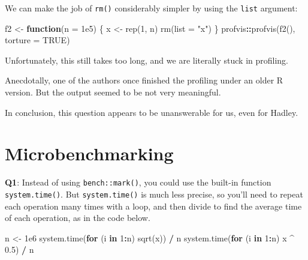 \documentclass[
]{krantz}
\makeatletter
\newenvironment{Shaded}{\begin{snugshade}}{\end{snugshade}}
\newcommand{\ControlFlowTok}[1]{\textcolor[rgb]{0.13,0.29,0.53}{\textbf{#1}}}
\newcommand{\DataTypeTok}[1]{\textcolor[rgb]{0.13,0.29,0.53}{#1}}
\newcommand{\DecValTok}[1]{\textcolor[rgb]{0.00,0.00,0.81}{#1}}
\newcommand{\FloatTok}[1]{\textcolor[rgb]{0.00,0.00,0.81}{#1}}
\newcommand{\KeywordTok}[1]{\textcolor[rgb]{0.13,0.29,0.53}{\textbf{#1}}}
\newcommand{\NormalTok}[1]{#1}
\newcommand{\OperatorTok}[1]{\textcolor[rgb]{0.81,0.36,0.00}{\textbf{#1}}}
\newcommand{\OtherTok}[1]{\textcolor[rgb]{0.56,0.35,0.01}{#1}}
\newcommand{\StringTok}[1]{\textcolor[rgb]{0.31,0.60,0.02}{#1}}
\newenvironment{kframe}{%
\medskip{}
\setlength{\fboxsep}{.8em}
 \def\at@end@of@kframe{}%
 \ifinner\ifhmode%
  \def\at@end@of@kframe{\end{minipage}}%
  \begin{minipage}{\columnwidth}%
 \fi\fi%
 \def\FrameCommand##1{\hskip\@totalleftmargin \hskip-\fboxsep
 \colorbox{shadecolor}{##1}\hskip-\fboxsep
     \hskip-\linewidth \hskip-\@totalleftmargin \hskip\columnwidth}%
 \MakeFramed {\advance\hsize-\width
   \@totalleftmargin\z@ \linewidth\hsize
   \@setminipage}}%
 {\par\unskip\endMakeFramed%
 \at@end@of@kframe}
\renewenvironment{Shaded}{\begin{kframe}}{\end{kframe}}
\renewcommand{\KeywordTok} [1]{\textcolor[rgb]{0.00,0.44,0.13}{{#1}}}
\renewcommand{\DataTypeTok}[1]{\textcolor[rgb]{0.56,0.13,0.00}{{#1}}}
\renewcommand{\DecValTok}  [1]{\textcolor[rgb]{0.25,0.63,0.44}{{#1}}}
\renewcommand{\FloatTok}   [1]{\textcolor[rgb]{0.25,0.63,0.44}{{#1}}}
\renewcommand{\StringTok}  [1]{\textcolor[rgb]{0.25,0.44,0.63}{{#1}}}
\renewcommand{\OtherTok}   [1]{\textcolor[rgb]{0.00,0.44,0.13}{{#1}}}
\renewcommand{\NormalTok}  [1]{{#1}}
\makeatother
\begin{document}
We can make the job of \texttt{rm()} considerably simpler by using the \texttt{list} argument:

\begin{Shaded}
\begin{Highlighting}[]
\NormalTok{f2 <-}\StringTok{ }\ControlFlowTok{function}\NormalTok{(}\DataTypeTok{n =} \FloatTok{1e5}\NormalTok{) \{}
\NormalTok{  x <-}\StringTok{ }\KeywordTok{rep}\NormalTok{(}\DecValTok{1}\NormalTok{, n)}
  \KeywordTok{rm}\NormalTok{(}\DataTypeTok{list =} \StringTok{"x"}\NormalTok{)}
\NormalTok{\}}
\NormalTok{profvis}\OperatorTok{::}\KeywordTok{profvis}\NormalTok{(}\KeywordTok{f2}\NormalTok{(), }\DataTypeTok{torture =} \OtherTok{TRUE}\NormalTok{)}
\end{Highlighting}
\end{Shaded}

Unfortunately, this still takes too long, and we are literally stuck in profiling.

Anecdotally, one of the authors once finished the profiling under an older R version. But the output seemed to be not very meaningful.

In conclusion, this question appears to be unanswerable for us, even for Hadley.

\hypertarget{microbenchmarking}{%
\section{Microbenchmarking}\label{microbenchmarking}}

\textbf{{Q1}}: Instead of using \texttt{bench::mark()}, you could use the built-in function \texttt{system.time()}. But \texttt{system.time()} is much less precise, so you'll need to repeat each operation many times with a loop, and then divide to find the average time of each operation, as in the code below.

\begin{Shaded}
\begin{Highlighting}[]
\NormalTok{n <-}\StringTok{ }\FloatTok{1e6}
\KeywordTok{system.time}\NormalTok{(}\ControlFlowTok{for}\NormalTok{ (i }\ControlFlowTok{in} \DecValTok{1}\OperatorTok{:}\NormalTok{n) }\KeywordTok{sqrt}\NormalTok{(x)) }\OperatorTok{/}\StringTok{ }\NormalTok{n}
\KeywordTok{system.time}\NormalTok{(}\ControlFlowTok{for}\NormalTok{ (i }\ControlFlowTok{in} \DecValTok{1}\OperatorTok{:}\NormalTok{n) x }\OperatorTok{^}\StringTok{ }\FloatTok{0.5}\NormalTok{) }\OperatorTok{/}\StringTok{ }\NormalTok{n}
\end{Highlighting}
\end{Shaded}
\end{document}
